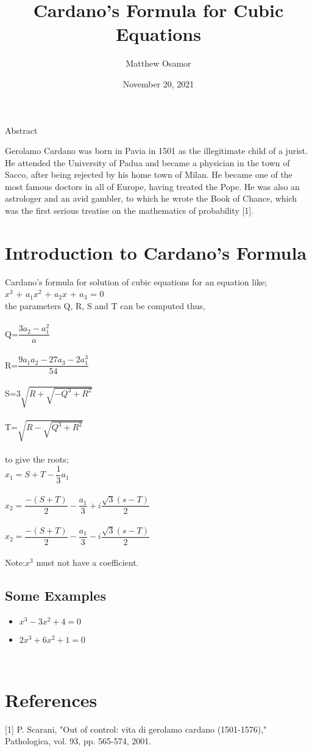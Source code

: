 \documentclass{article}
\title{Cardano's Formula for Cubic Equations}
\author{Matthew Osamor}
\date{November 20, 2021}
\begin{document}
	\maketitle
	\begin{center}

\begin{center}	
		Abstract
		\end{center}
	\begin{center}  
		
	  Gerolamo Cardano was born in Pavia in 1501 as the illegitimate child of a jurist. He attended the University of Padua and became a physician in the town of Sacco, after being rejected by his home town of Milan. He became one of the most famous doctors in all of Europe, having treated the Pope. He was also an astrologer and an avid gambler, to which he wrote the Book of Chance, which was the first serious treatise on the mathematics of probability [1].
	\end{center}
	\end{center}
\section{Introduction to Cardano's Formula}
Cardano's formula for solution of cubic equations for an equation like;\\
$x^3$ + $a_{1}x^2$ + $a_{2}x$ + $a_{3}$ = 0\\
the parameters Q, R, S and T can be computed thus,\\
\\
Q=$\dfrac{3a_{2}-a_{1}^2}{a}$\\
 \\
R=$\dfrac{{9a_1a_2-27a_3-2a^3_1}}{54}$\\
\\
S=$3\sqrt{R+\sqrt{-Q^3+R^2}}$\\
\\
T=$\sqrt{R-\sqrt{Q^3+R^2}}$\\
\\
to give the roots;\\
$x_{1}=S+T-\dfrac{1}{3}a_{1}$\\
\\
$x_{2}=\dfrac{-(S+T)}{2}-\dfrac{a_1}{3}+i\dfrac{\sqrt{3}(s-T)}{2}$\\
\\
$x_{2}=\dfrac{-(S+T)}{2}-\dfrac{a_1}{3}-i\dfrac{\sqrt{3}(s-T)}{2}$\\
\\
Note:$x^3$ must not have a coefficient.\\
\subsection{Some Examples}
\begin{itemize}
 \item $x^3-3x^2+4=0$
 \item $2x^3+6x^2+1=0$
 \end{itemize}\\
\section{References}
[1] P. Scarani, "Out of control: vita di gerolamo cardano (1501-1576),"\\
Pathologica, vol. 93, pp. 565-574, 2001.
\end{document}
